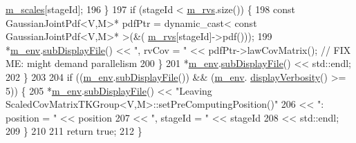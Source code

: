 \begin{DoxyCode}
      \hyperlink{class_q_u_e_s_o_1_1_base_t_k_group_ad36d4dc6f4812e3e10d8090f0dbb9e40}{m\_scales}[stageId];
196     \}
197     \textcolor{keywordflow}{if} (stageId < \hyperlink{class_q_u_e_s_o_1_1_base_t_k_group_a87c6b02ea45ab3de634c22afa58f53a5}{m\_rvs}.size()) \{
198       \textcolor{keyword}{const} GaussianJointPdf<V,M>* pdfPtr = \textcolor{keyword}{dynamic\_cast<} \textcolor{keyword}{const }GaussianJointPdf<V,M>* \textcolor{keyword}{>}(&(
      \hyperlink{class_q_u_e_s_o_1_1_base_t_k_group_a87c6b02ea45ab3de634c22afa58f53a5}{m\_rvs}[stageId]->pdf()));
199       *\hyperlink{class_q_u_e_s_o_1_1_base_t_k_group_a2bce5e8aa5c844d4332a0e73cf00a1f9}{m\_env}.\hyperlink{class_q_u_e_s_o_1_1_base_environment_a8a0064746ae8dddfece4229b9ad374d6}{subDisplayFile}() << \textcolor{stringliteral}{", rvCov = "} << pdfPtr->lawCovMatrix(); \textcolor{comment}{// FIX ME:
       might demand parallelism}
200     \}
201     *\hyperlink{class_q_u_e_s_o_1_1_base_t_k_group_a2bce5e8aa5c844d4332a0e73cf00a1f9}{m\_env}.\hyperlink{class_q_u_e_s_o_1_1_base_environment_a8a0064746ae8dddfece4229b9ad374d6}{subDisplayFile}() << std::endl;
202   \}
203 
204   \textcolor{keywordflow}{if} ((\hyperlink{class_q_u_e_s_o_1_1_base_t_k_group_a2bce5e8aa5c844d4332a0e73cf00a1f9}{m\_env}.\hyperlink{class_q_u_e_s_o_1_1_base_environment_a8a0064746ae8dddfece4229b9ad374d6}{subDisplayFile}()) && (\hyperlink{class_q_u_e_s_o_1_1_base_t_k_group_a2bce5e8aa5c844d4332a0e73cf00a1f9}{m\_env}.
      \hyperlink{class_q_u_e_s_o_1_1_base_environment_a1fe5f244fc0316a0ab3e37463f108b96}{displayVerbosity}() >= 5)) \{
205     *\hyperlink{class_q_u_e_s_o_1_1_base_t_k_group_a2bce5e8aa5c844d4332a0e73cf00a1f9}{m\_env}.\hyperlink{class_q_u_e_s_o_1_1_base_environment_a8a0064746ae8dddfece4229b9ad374d6}{subDisplayFile}() << \textcolor{stringliteral}{"Leaving
       ScaledCovMatrixTKGroup<V,M>::setPreComputingPosition()"}
206                            << \textcolor{stringliteral}{": position = "} << position
207                            << \textcolor{stringliteral}{", stageId = "}  << stageId
208                            << std::endl;
209   \}
210 
211   \textcolor{keywordflow}{return} \textcolor{keyword}{true};
212 \}
\end{DoxyCode}
